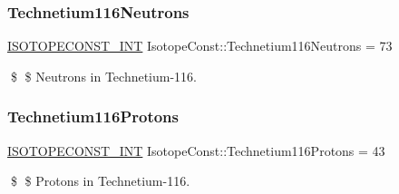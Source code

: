 \subsubsection{\texorpdfstring{Technetium116\+Neutrons}{Technetium116Neutrons}}
{\footnotesize\ttfamily \mbox{\hyperlink{group___isotope_const-_macros_ga5f18360b3e99483a35c32d789e62621c}{I\+S\+O\+T\+O\+P\+E\+C\+O\+N\+S\+T\+\_\+\+I\+NT}} Isotope\+Const\+::\+Technetium116\+Neutrons = 73}

\$ \$ Neutrons in Technetium-\/116. \mbox{\label{group___isotope_const-_technetium-_tc116_ga14ad2ef13d5daf3d3ef7b8d5ab965291}} 
\subsubsection{\texorpdfstring{Technetium116\+Protons}{Technetium116Protons}}
{\footnotesize\ttfamily \mbox{\hyperlink{group___isotope_const-_macros_ga5f18360b3e99483a35c32d789e62621c}{I\+S\+O\+T\+O\+P\+E\+C\+O\+N\+S\+T\+\_\+\+I\+NT}} Isotope\+Const\+::\+Technetium116\+Protons = 43}

\$ \$ Protons in Technetium-\/116. 